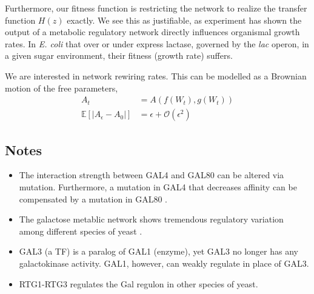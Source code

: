 \documentclass[11 pt]{article}
\begin{document}
    Furthermore, our fitness function is restricting the network to realize the transfer function $H(z)$ exactly. We see this as justifiable, as experiment has shown the output of a metabolic regulatory network directly influences organismal growth rates. In \citet{dekel2005optimality} \emph{E. coli} that over or under express lactase, governed by the \emph{lac} operon, in a given sugar environment, their fitness (growth rate) suffers.

    We are interested in network rewiring rates. This can be modelled as a Brownian motion of the free parameters,
    \begin{align*}
      A_{t} &= A(f(W_{t}), g(W_{t})) \\
      \mathbb{E} [ | A_{\epsilon} - A_{0} | ] &= \epsilon + \mathcal{O}(\epsilon^{2})
    \end{align*}
    \subsection{Notes}
    \begin{itemize}
      \item The interaction strength between GAL4 and GAL80 can be altered via mutation. Furthermore, a mutation in GAL4 that decreases affinity can be compensated by a mutation in GAL80 \citep{li2010alterations, salmeron1990gal4, adhikari2014perturbation}.
      \item The galactose metablic network shows tremendous regulatory variation among different species of yeast \citep{lavoie2009rearrangements, martchenko2007transcriptional, dalal2016transcriptional, christensen2011unique, hartl2007induction, alam2013aspergillus}.
      \item GAL3 (a TF) is a paralog of GAL1 (enzyme), yet GAL3 no longer has any galactokinase activity. GAL1, however, can weakly regulate in place of GAL3.
      \item RTG1-RTG3 regulates the Gal regulon in other species of yeast. 
    \end{itemize}
\end{document}
